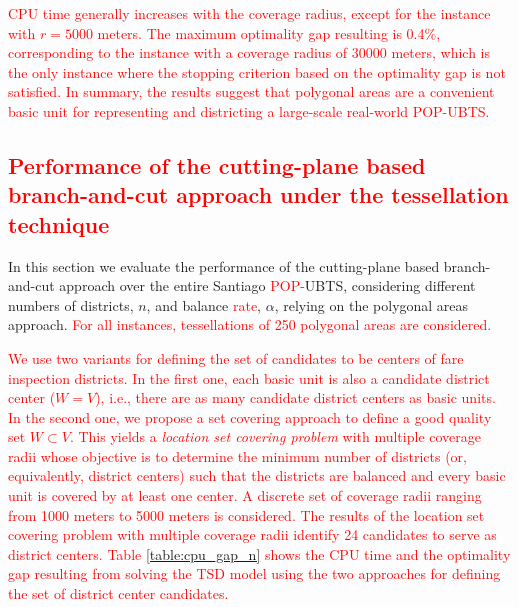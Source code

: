 \documentclass[preprint,11pt]{elsarticle}
\begin{document}
\textcolor{red}{CPU time generally increases with the coverage radius, except for the instance with $r=5000$ meters.
The maximum optimality gap resulting is 0.4\%, corresponding to the instance with a coverage radius of 30000 meters, which is the only instance where the stopping criterion based on the optimality gap is not satisfied.
In summary, the results suggest that polygonal areas are a convenient basic unit for representing and districting a large-scale real-world POP-UBTS.}


\subsection{\textcolor{red}{Performance of the cutting-plane based branch-and-cut approach under the tessellation technique}} \label{sec:performance}

In this section we evaluate the performance of the cutting-plane based branch-and-cut approach over the entire Santiago \textcolor{red}{POP-}UBTS, considering different numbers of districts, $n$, and balance \textcolor{red}{rate}, $\alpha$, relying on the polygonal areas approach.
\textcolor{red}{For all instances,  tessellations of 250 polygonal areas are considered.}

\textcolor{red}{We use two variants for defining the set of candidates to be centers of fare inspection districts.
In the first one, each basic unit is also a candidate district center ($W = V$), i.e., there are as many candidate district centers as basic units.
In the second one, we propose a set covering approach to define a good quality set $W \subset V$.
This yields a \textit{location set covering problem} \citep{Toregas1971} with multiple coverage radii whose objective is to determine the minimum number of districts (or, equivalently, district centers) such that the districts are balanced and every basic unit is covered by at least one center.
A discrete set of coverage radii ranging from 1000 meters to 5000 meters is considered. 
The results of the location set covering problem with multiple coverage radii identify 24 candidates to serve as district centers.}
\textcolor{red}{Table \ref{table:cpu_gap_n} shows the CPU time and the optimality gap resulting from solving the TSD model using the two approaches for defining the set of district center candidates.}
\end{document}

